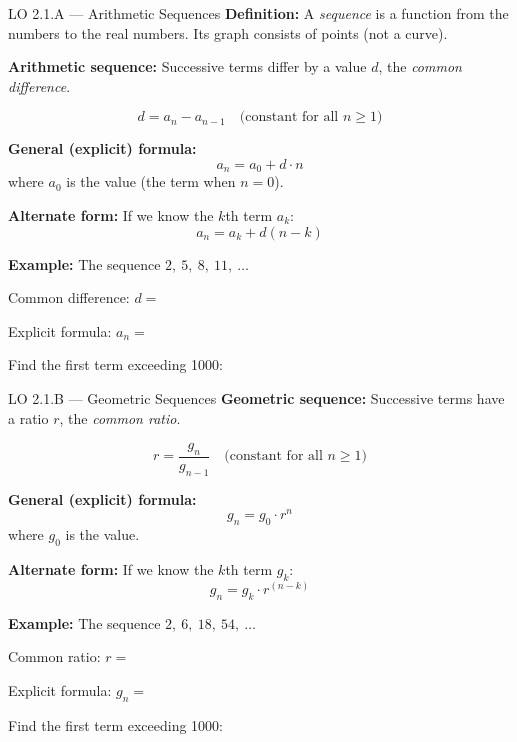 \documentclass[10pt]{article}
\begin{document}
\begin{notesbox}{LO 2.1.A --- Arithmetic Sequences}
\textbf{Definition:} A \textit{sequence} is a function from the  numbers to the real numbers.
Its graph consists of  points (not a curve).

\medskip
\textbf{Arithmetic sequence:} Successive terms differ by a  value $d$, the
\textit{common difference}.

\[
  d = a_n - a_{n-1} \quad \text{(constant for all } n \geq 1\text{)}
\]

\textbf{General (explicit) formula:}
\[
  a_n = a_0 + d \cdot n
\]
where $a_0$ is the  value (the term when $n = 0$).

\medskip
\textbf{Alternate form:} If we know the $k$th term $a_k$:
\[
  a_n = a_k + d(n - k)
\]

\medskip
\textbf{Example:} The sequence $2,\ 5,\ 8,\ 11,\ \ldots$

\smallskip
Common difference: $d = $ 

\smallskip
Explicit formula: $a_n = $ 

\smallskip
Find the first term exceeding 1000: 
\end{notesbox}

\vspace{0.04in}

\begin{notesbox}{LO 2.1.B --- Geometric Sequences}
\textbf{Geometric sequence:} Successive terms have a  ratio $r$, the
\textit{common ratio}.

\[
  r = \frac{g_n}{g_{n-1}} \quad \text{(constant for all } n \geq 1\text{)}
\]

\textbf{General (explicit) formula:}
\[
  g_n = g_0 \cdot r^n
\]
where $g_0$ is the  value.

\medskip
\textbf{Alternate form:} If we know the $k$th term $g_k$:
\[
  g_n = g_k \cdot r^{(n-k)}
\]

\medskip
\textbf{Example:} The sequence $2,\ 6,\ 18,\ 54,\ \ldots$

\smallskip
Common ratio: $r = $ 

\smallskip
Explicit formula: $g_n = $ 

\smallskip
Find the first term exceeding 1000: 
\end{notesbox}
\end{document}
